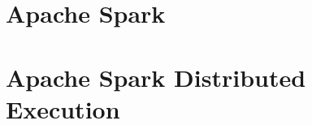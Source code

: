 \section{Apache Spark}\label{sec:apache-spark}


\section{Apache Spark Distributed Execution}\label{sec:apache-spark-distributed-execution}


